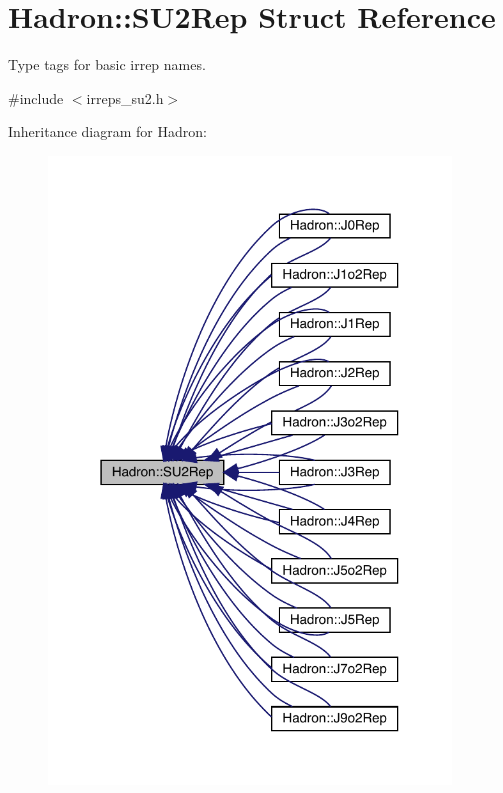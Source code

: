 \hypertarget{structHadron_1_1SU2Rep}{}\section{Hadron\+:\+:S\+U2\+Rep Struct Reference}
\label{structHadron_1_1SU2Rep}


Type tags for basic irrep names.  




{\ttfamily \#include $<$irreps\+\_\+su2.\+h$>$}



Inheritance diagram for Hadron\+:
\nopagebreak
\begin{figure}[H]
\begin{center}
\leavevmode
\includegraphics[width=303pt]{de/d2f/structHadron_1_1SU2Rep__inherit__graph}
\end{center}
\end{figure}
